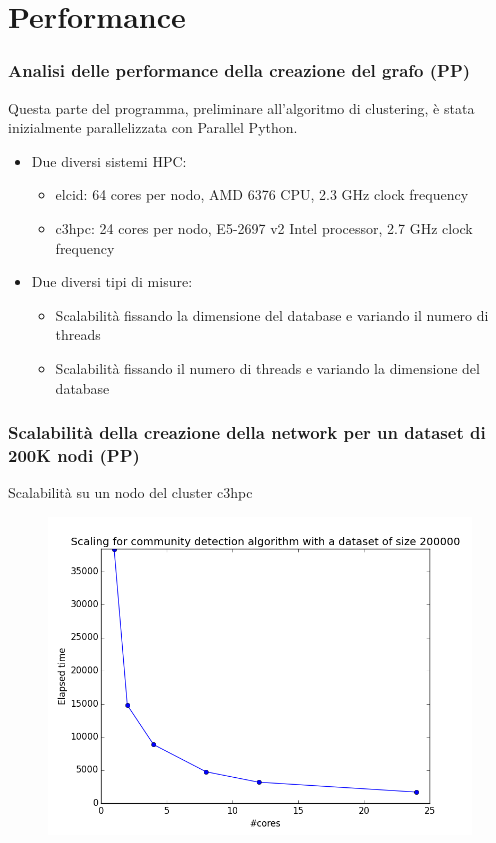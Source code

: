 \documentclass{beamer}
\begin{document}
\section{Performance}
\frame{\sectionpage}
\begin{frame}
\frametitle{Analisi delle performance della creazione del grafo (PP)}
Questa parte del programma, preliminare all'algoritmo di clustering, è stata inizialmente parallelizzata con Parallel Python.
\begin{itemize}
\item Due diversi sistemi HPC:
\begin{itemize}
\item elcid: 64 cores per nodo, AMD 6376 CPU, 2.3 GHz clock frequency
\item c3hpc: 24 cores per nodo, E5-2697 v2 Intel processor, 2.7 GHz clock frequency
\end{itemize}
\item Due diversi tipi di misure:
\begin{itemize}
\item Scalabilità fissando la dimensione del database e variando il numero di threads
\item Scalabilità fissando il numero di threads e variando la dimensione del database
\end{itemize}
\end{itemize}
\end{frame}
\begin{frame}
 \frametitle{Scalabilità della creazione della network per un dataset di 200K nodi (PP)}
 Scalabilità su un nodo del cluster c3hpc
  \begin{figure}[htbp]
\centering
\includegraphics[height=6.0 cm,width=10 cm]{label_200K.png}

\end{figure}
\end{frame}
\end{document}
